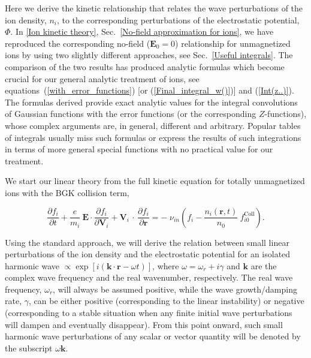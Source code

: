 \documentclass[draft]{agujournal2019}
\renewcommand{\vec}{\mathbf}
\begin{document}
Here we derive the kinetic relationship that relates the wave perturbations of
the ion density, $n_{i}$, to the corresponding perturbations of the
electrostatic potential, $\Phi$. In \ref{Ion kinetic theory},
Sec.~\ref{No-field approximation for ions}, we have reproduced the
corresponding no-field ($\vec{E}_{0}=0$) relationship for unmagnetized ions
\cite{Lee:High-Frequency71, Schmidt:Density73} by using two slightly different
approaches, see Sec.~\ref{Useful integrals}. The comparison of the two results has
produced analytic formulas which become crucial for our general
analytic treatment of ions, see equations~(\ref{with_error_functions}) [or
(\ref{Final_integral_w()})] and (\ref{Int(z..)}). The formulas derived provide
exact analytic values for the integral convolutions of Gaussian functions with
the error functions (or the corresponding $Z$-functions), whose complex
arguments are, in general, different and arbitrary.
Popular tables of integrals usually miss such formulas \cite{Dwight:Tables88,Jeffrey:Handbook95,Gradshteyn:Table07} 
or express the results of such integrations
in terms of more general special functions \cite{Prudnikov:Integrals86} with no practical value for our
treatment. 

We start our linear theory from the full kinetic equation for totally unmagnetized
ions with the BGK collision term,
\begin{linenomath*}
\begin{equation}
\frac{\partial f_{i}}{\partial t}+\frac{e}{m_{i}}\ \vec{E}\cdot\frac{\partial
f_{i}}{\partial\vec{V}_{i}}+\vec{V}_{i}\mathbf{\,\cdot\,}
\frac{\partial f_{i}}{\partial\vec{r}}=-\;\nu_{in}\left(  f_{i}-\frac{n_{i}(\vec{r},t)}{n_{0}}
\ f_{i0}^{\mathrm{Coll}}\right).
\label{Initial_kinetic_Review}
\end{equation}
\end{linenomath*}
Using the standard approach, we will derive the relation between small linear
perturbations of the ion density and the electrostatic potential for an
isolated harmonic wave $\propto\exp[i(\vec{k}\cdot\vec{r}-\omega t)]$, where
$\omega=\omega_{r}+i\gamma$ and $\vec{k}$ are the complex wave frequency and
the real wavenumber, respectively. The real wave frequency, $\omega_{r}$, will
always be assumed positive, while the wave growth/damping rate, $\gamma$, can be
either positive (corresponding to the linear instability) or negative (corresponding to a
stable situation when any finite initial wave perturbations will dampen and eventually
disappear). From this point onward, such small harmonic wave perturbations of
any scalar or vector quantity will be denoted by the subscript $\omega\vec{k}$.
\end{document}
